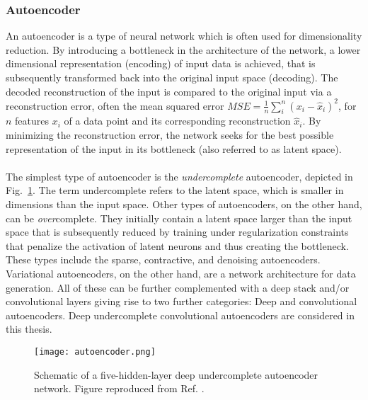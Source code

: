 \documentclass[../../main.tex]{subfiles}
\begin{document}
\subsubsection{Autoencoder}\label{sec:ae}
An autoencoder is a type of neural network which is often used for dimensionality reduction. By introducing a bottleneck in the architecture of the network, a lower dimensional representation (encoding) of input data is achieved, that is subsequently transformed back into the original input space (decoding). The decoded reconstruction of the input is compared to the original input via a reconstruction error, often the mean squared error $MSE=\frac{1}{n}\sum_i^n{(x_i-\hat x_i)^2}$, for $n$ features $x_i$ of a data point and its corresponding reconstruction $\hat x_i$. By minimizing the reconstruction error, the network seeks for the best possible representation of the input in its bottleneck (also referred to as latent space).\\
\\
The simplest type of autoencoder is the \textit{undercomplete} autoencoder, depicted in Fig.~\ref{fig:autoenc}. The term undercomplete refers to the latent space, which is smaller in dimensions than the input space. Other types of autoencoders, on the other hand, can be \textit{over}complete. They initially contain a latent space larger than the input space that is subsequently reduced by training under regularization constraints that penalize the activation of latent neurons and thus creating the bottleneck. These types include the sparse, contractive, and denoising autoencoders. Variational autoencoders, on the other hand, are a network architecture for data generation. All of these can be further complemented with a deep stack and/or convolutional layers giving rise to two further categories: Deep and convolutional autoencoders. Deep undercomplete convolutional autoencoders are considered in this thesis.\\
\begin{figure}[htp]
	\begin{center}
		\texttt{[image: autoencoder.png]}
		\caption{Schematic of a five-hidden-layer deep undercomplete autoencoder network. Figure reproduced from Ref. \cite{menshawy18}.}
		\label{fig:autoenc}
	\end{center}
\end{figure}
\\
\end{document}
